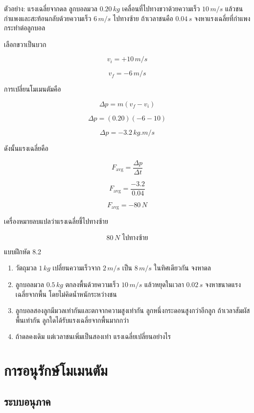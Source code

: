 \begin{examplebox}{ตัวอย่าง: แรงเฉลี่ยจากดล}
ลูกบอลมวล $0.20\,\si{kg}$ เคลื่อนที่ไปทางขวาด้วยความเร็ว $10\,\si{m/s}$ แล้วชนกำแพงและสะท้อนกลับด้วยความเร็ว $6\,\si{m/s}$ ไปทางซ้าย ถ้าเวลาชนคือ $0.04\,\si{s}$ จงหาแรงเฉลี่ยที่กำแพงกระทำต่อลูกบอล

เลือกขวาเป็นบวก

\[
v_i=+10\,\si{m/s}
\]

\[
v_f=-6\,\si{m/s}
\]

การเปลี่ยนโมเมนตัมคือ

\[
\Delta p=m(v_f-v_i)
\]

\[
\Delta p=(0.20)(-6-10)
\]

\[
\Delta p=-3.2\,\si{kg.m/s}
\]

ดังนั้นแรงเฉลี่ยคือ

\[
F_{\text{avg}}=\frac{\Delta p}{\Delta t}
\]

\[
F_{\text{avg}}=\frac{-3.2}{0.04}
\]

\[
F_{\text{avg}}=-80\,\si{N}
\]

เครื่องหมายลบแปลว่าแรงเฉลี่ยชี้ไปทางซ้าย

\[
\boxed{80\,\si{N} \text{ ไปทางซ้าย}}
\]
\end{examplebox}

\begin{exercisebox}{แบบฝึกหัด 8.2}
\begin{enumerate}
    \item วัตถุมวล $1\,\si{kg}$ เปลี่ยนความเร็วจาก $2\,\si{m/s}$ เป็น $8\,\si{m/s}$ ในทิศเดียวกัน จงหาดล
    \item ลูกบอลมวล $0.5\,\si{kg}$ ตกลงพื้นด้วยความเร็ว $10\,\si{m/s}$ แล้วหยุดในเวลา $0.02\,\si{s}$ จงหาขนาดแรงเฉลี่ยจากพื้น โดยไม่คิดน้ำหนักระหว่างชน
    \item ลูกบอลสองลูกมีมวลเท่ากันและตกจากความสูงเท่ากัน ลูกหนึ่งกระดอนสูงกว่าอีกลูก ถ้าเวลาสัมผัสพื้นเท่ากัน ลูกใดได้รับแรงเฉลี่ยจากพื้นมากกว่า
    \item ถ้าดลคงเดิม แต่เวลาชนเพิ่มเป็นสองเท่า แรงเฉลี่ยเปลี่ยนอย่างไร
\end{enumerate}
\end{exercisebox}

\section{การอนุรักษ์โมเมนตัม}

\subsection{ระบบอนุภาค}

